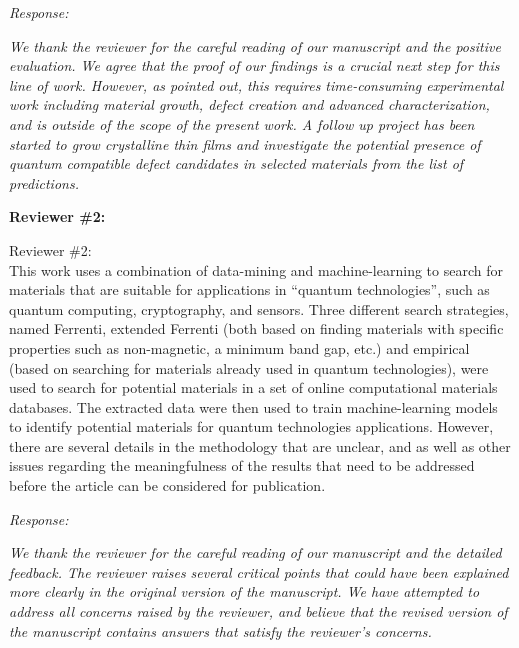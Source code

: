 \documentclass[11pt, a4paper]{letter} %
\begin{document}
\textit{Response: }  

\textit{We thank the reviewer for the careful reading of our manuscript and the positive evaluation. We agree that the proof of our findings is a crucial next step for this line of work. However, as pointed out, this requires time-consuming experimental work including material growth, defect creation and advanced characterization, and is outside of the scope of the present work. A follow up project has been started to grow crystalline thin films and investigate the potential presence of quantum compatible defect candidates in selected materials from the list of predictions. }

\noindent
\textbf{Reviewer \#2: }

Reviewer \#2: \\
This work uses a combination of data-mining and machine-learning to search for materials that are suitable for applications in “quantum technologies”, such as quantum computing, cryptography, and sensors. Three different search strategies, named Ferrenti, extended Ferrenti (both based on finding materials with specific properties such as non-magnetic, a minimum band gap, etc.) and empirical (based on searching for materials already used in quantum technologies), were used to search for potential materials in a set of online computational materials databases. The extracted data were then used to train machine-learning models to identify potential materials for quantum technologies applications. However, there are several details in the methodology that are unclear, and as well as other issues regarding the meaningfulness of the results that need to be addressed before the article can be considered for publication.

\textit{Response:}  

\textit{We thank the reviewer for the careful reading of our manuscript and the detailed feedback. The reviewer raises several critical points that could have been explained more clearly in the original version of the manuscript. We have attempted to address all concerns raised by the reviewer, and believe that the revised version of the manuscript contains answers that satisfy the reviewer’s concerns. } 
\end{document}
